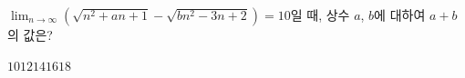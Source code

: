 $\displaystyle\lim_{n\to\infty}(\sqrt{n^2+an+1}-\sqrt{bn^2-3n+2})=10$일 때, 상수 $a$, $b$에 대하여 $a+b$의 값은?
\begin{choices32}{$10$}{$12$}{$14$}{$16$}{$18$}\end{choices32}
